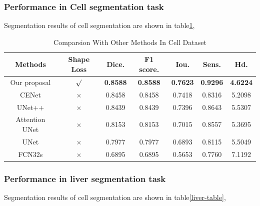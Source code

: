 \documentclass[UTF8]{article} %
\begin{document}
\subsubsection{Performance in Cell segmentation task}
Segmentation results of cell segmentation are shown in table\ref{cell-table}, 

  \begin{table}[H]
    \vspace{-2mm}
    \begin{center}\small
    \caption{Comparsion With Other Methods In Cell\cite{dsb2018} Dataset}
    \label{cell-table}
    \begin{tabular}{ccccccc}
      
    \toprule
    Methods & Shape Loss & Dice. & F1 score. & Iou. & Sens. & Hd.\\
    \midrule
      Our proposal & $\surd$ & \textbf{0.8588} & \textbf{0.8588} & \textbf{0.7623} & \textbf{0.9296} & \textbf{4.6224}\\
      CENet & $\times$ & 0.8458 & 0.8458 & 0.7418 & 0.8316 & 5.2098\\
      UNet++ & $\times$ & 0.8439 & 0.8439 & 0.7396 & 0.8643 & 5.5307\\
      Attention UNet & $\times$ & 0.8153 & 0.8153 & 0.7015 & 0.8557 & 5.3695\\
      UNet  & $\times$  & 0.7977 & 0.7977 & 0.6893 & 0.8115 & 5.5049\\
      FCN32s & $\times$ & 0.6895 & 0.6895 & 0.5653 & 0.7760 & 7.1192\\
  \bottomrule    
    \end{tabular}
    \end{center}
    \vspace{-4mm}
  \end{table}

  \subsubsection{Performance in liver segmentation task}
Segmentation results of cell segmentation are shown in table\ref{liver-table}, 
\end{document}
